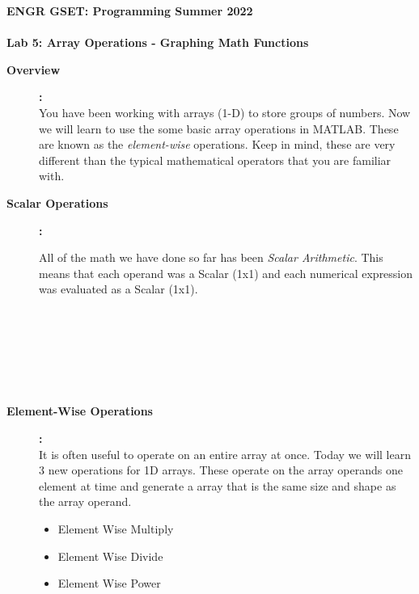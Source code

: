 \documentclass[11pt]{article}
\newcommand{\secNum}{GSET: Programming}
\newcommand{\assnType}{Lab}
\newcommand{\assnTitle}{Array Operations - Graphing Math Functions}
\newcommand{\assnNum}{5}
\newcommand{\currTerm}{Summer 2022}
\begin{document}
    \textbf{\LARGE ENGR \hspace{2mm}\secNum \hspace{3mm} \currTerm} \\\\
    \textbf{\LARGE \assnType \hspace{1mm}  \assnNum : \assnTitle}

    \begin{description}
        
        \item [\textbf{Overview}]\textbf{:} \\
        
            You have been working with arrays (1-D) to store groups of numbers. Now we will learn to use the some basic array operations in MATLAB. These are known as the {\it element-wise} operations. Keep in mind, these are very different than the typical mathematical operators that you are familiar with.

	\item [\textbf{Scalar Operations}]\textbf{:} 
	
	All of the math we have done so far has been {\it Scalar Arithmetic}. This means that each operand was a Scalar (1x1) and each numerical expression was evaluated as a Scalar (1x1). \\
	
	  \\\\
	   \\
	  
	   \\\\
	   \\
		
	
	\item [\textbf{Element-Wise Operations}]\textbf{:} \\
	
	It is often useful to operate on an entire array at once. Today we will learn 3 new operations for 1D arrays. These operate on the array operands one element at time and generate a array that is the same size and shape as the array operand.
	\begin{itemize}
		\item Element Wise Multiply  \\
		\item Element Wise Divide  \\
		\item Element Wise Power  \\
		

\end{itemize}
\end{description}
\end{document}
